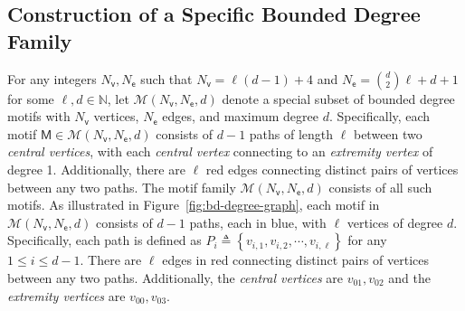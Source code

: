 \documentclass[letterpaper,11pt]{article}
\theoremstyle{definition}
\newcommand{\maM}{\mathcal{M}}
\newcommand{\nbr}[1]{{\sf\color{red}[#1]}}
\newcommand{\sth}[1]{\left\{ #1 \right\}}
\newcommand{\sfM}{{\mathsf{M}}}
\newcommand{\sfe}{{\mathsf{e}}}
\newcommand{\sfv}{{\mathsf{v}}}
\begin{document}
\subsection{Construction of a Specific Bounded Degree Family}\label{subsec:bd-degree-specific}
For any integers $N_\sfv,N_\sfe$ such that $N_\sfv= \ell(d-1)+4$ and $N_\sfe = \binom{d}{2}\ell+d+1$ for some $\ell,d\in \mathbb N$, let $\maM(N_\sfv,N_\sfe,d)$ denote a special subset of bounded degree motifs with $N_\sfv$ vertices, $N_\sfe$ edges, and maximum degree $d$. Specifically, each motif $\sfM\in \maM(N_\sfv,N_\sfe,d)$ consists of $d-1$ paths of length $\ell$ between  two \emph{central vertices}, with each \emph{central vertex} connecting to an \emph{extremity vertex} of degree 1.
Additionally, there are $\ell$ red edges connecting distinct pairs of vertices between any two paths. The motif family $\maM(N_\sfv,N_\sfe,d)$ consists of all such motifs.
As illustrated in Figure~\ref{fig:bd-degree-graph}, each motif in $\maM(N_\sfv,N_\sfe,d)$ consists of 
$d-1$ paths, each in blue, with $\ell$ vertices of degree $d$. 
Specifically, each path is defined as $P_i\triangleq \sth{{v_{i,1}},v_{i,2},\cdots, v_{i,\ell}}$ for any $1\le i\le d-1$.
There are $\ell$ edges in red connecting distinct pairs of vertices between any two paths. 
Additionally, the \emph{central vertices} are $v_{01}, v_{02}$ and the \emph{extremity vertices} are $v_{00},v_{03}$.
\end{document}
